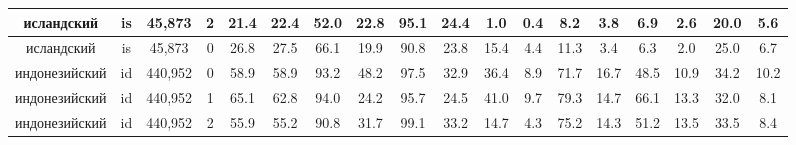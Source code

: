 \begin{table*}
{\begin{tabular}{|c|c|c|c||c|c|c|c|c|c|c|c|c|c|c|c|c|c|}
исландский & is & 45,873 & 2 & 21.4 & 22.4 & 52.0 & 22.8 & 95.1 & 24.4 & 1.0 & 0.4 & 8.2 & 3.8 & 6.9 & 2.6 & 20.0 & 5.6\\ \hline
исландский & is & 45,873 & 0 & 26.8 & 27.5 & 66.1 & 19.9 & 90.8 & 23.8 & 15.4 & 4.4 & 11.3 & 3.4 & 6.3 & 2.0 & 25.0 & 6.7\\ \hline
индонезийский & id & 440,952 & 0 & 58.9 & 58.9 & 93.2 & 48.2 & 97.5 & 32.9 & 36.4 & 8.9 & 71.7 & 16.7 & 48.5 & 10.9 & 34.2 & 10.2\\ \hline
индонезийский & id & 440,952 & 1 & 65.1 & 62.8 & 94.0 & 24.2 & 95.7 & 24.5 & 41.0 & 9.7 & 79.3 & 14.7 & 66.1 & 13.3 & 32.0 & 8.1\\ \hline
индонезийский & id & 440,952 & 2 & 55.9 & 55.2 & 90.8 & 31.7 & 99.1 & 33.2 & 14.7 & 4.3 & 75.2 & 14.3 & 51.2 & 13.5 & 33.5 & 8.4\\ \hline
\end{tabular}
}
\end{table*}

